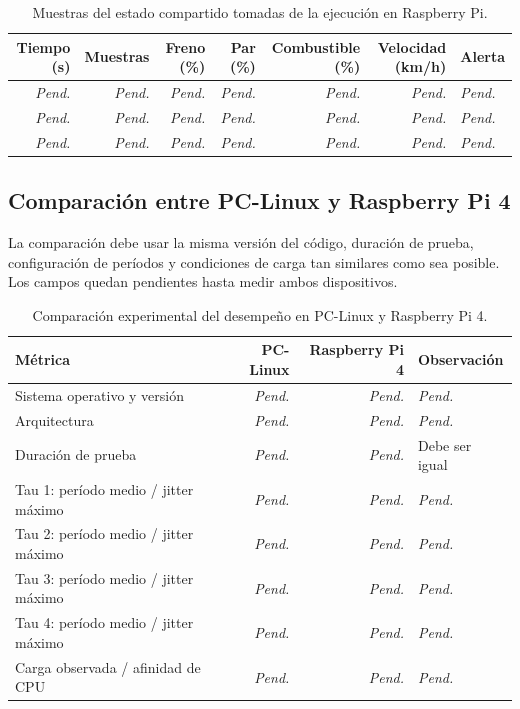 \documentclass[12pt,a4paper]{article}
\newcommand{\sinmedir}{\textit{Pend.}}
\begin{document}
\begin{table}[htbp]
  \centering
  \caption{Muestras del estado compartido tomadas de la ejecución en Raspberry Pi.}
  \label{tab:rpi-sincronia}
  \small
  \begin{tabularx}{\linewidth}{@{}r r r r r r X@{}}
    \toprule
    Tiempo (s) & Muestras & Freno (\%) & Par (\%) & Combustible (\%) & Velocidad (km/h) & Alerta \\
    \midrule
    \sinmedir & \sinmedir & \sinmedir & \sinmedir & \sinmedir & \sinmedir & \sinmedir \\
    \sinmedir & \sinmedir & \sinmedir & \sinmedir & \sinmedir & \sinmedir & \sinmedir \\
    \sinmedir & \sinmedir & \sinmedir & \sinmedir & \sinmedir & \sinmedir & \sinmedir \\
    \bottomrule
  \end{tabularx}
\end{table}

\subsection{Comparación entre PC-Linux y Raspberry Pi 4}

La comparación debe usar la misma versión del código, duración de prueba, configuración de períodos y condiciones de carga tan similares como sea posible. Los campos quedan pendientes hasta medir ambos dispositivos.

\begin{table}[htbp]
  \centering
  \caption{Comparación experimental del desempeño en PC-Linux y Raspberry Pi 4.}
  \label{tab:comparacion}
  \small
  \begin{tabularx}{\linewidth}{@{}X r r X@{}}
    \toprule
    Métrica & PC-Linux & Raspberry Pi 4 & Observación \\
    \midrule
    Sistema operativo y versión & \sinmedir & \sinmedir & \sinmedir \\
    Arquitectura & \sinmedir & \sinmedir & \sinmedir \\
    Duración de prueba & \sinmedir & \sinmedir & Debe ser igual \\
    Tau 1: período medio / jitter máximo & \sinmedir & \sinmedir & \sinmedir \\
    Tau 2: período medio / jitter máximo & \sinmedir & \sinmedir & \sinmedir \\
    Tau 3: período medio / jitter máximo & \sinmedir & \sinmedir & \sinmedir \\
    Tau 4: período medio / jitter máximo & \sinmedir & \sinmedir & \sinmedir \\
    Carga observada / afinidad de CPU & \sinmedir & \sinmedir & \sinmedir \\
    \bottomrule
  \end{tabularx}
\end{table}
\end{document}
